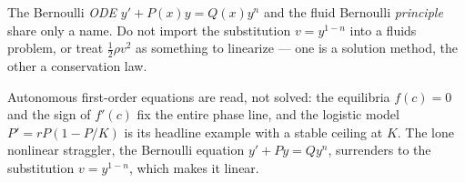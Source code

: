 \begin{warningbox}
The Bernoulli \emph{ODE} $y'+P(x)y = Q(x)y^{n}$ and the fluid Bernoulli
\emph{principle} share only a name. Do not import the substitution $v=y^{1-n}$
into a fluids problem, or treat $\tfrac{1}{2}\rho v^{2}$ as something to
linearize --- one is a solution method, the other a conservation law.
\end{warningbox}

\begin{conceptbox}
Autonomous first-order equations are read, not solved: the
\textcolor{accentorange}{equilibria $f(c)=0$} and the
\textcolor{accentorange}{sign of $f'(c)$} fix the entire phase line, and the
\textcolor{accentorange}{logistic model $P'=rP(1-P/K)$} is its headline example
with a stable ceiling at $K$. The lone nonlinear straggler, the
\textcolor{accentorange}{Bernoulli equation $y'+Py=Qy^{n}$}, surrenders to the
substitution \textcolor{accentorange}{$v=y^{1-n}$}, which makes it linear.
\end{conceptbox}


